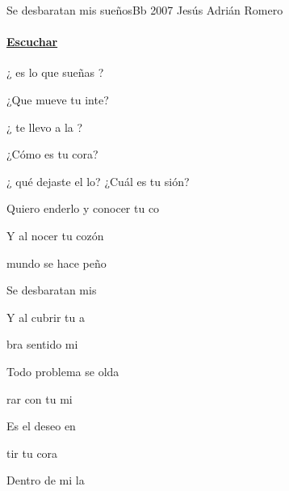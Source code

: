 \documentclass[12pt, spanish]{book}
\begin{document}
    \begin{song}{Se desbaratan mis sueños}{Bb}
    {2007} %
    {Jesús Adrián Romero}
    {} %
    {}
        \ifChordBk
            \paragraph{\mbox{}\hfill\protect\href{https://open.spotify.com/intl-es/track/2gJawrNKr8ZOANF4e4nwE3}{Escuchar}\mbox{}\hfill}
        \fi


        \begin{SBOpGroup}
            ¿ es lo que sueñas ?

            ¿Que mueve tu inte?

            ¿ te llevo a la ?

            ¿Cómo es tu cora?
        \end{SBOpGroup}
        \vskip 20pt
        \begin{SBOpGroup}
            ¿ qué dejaste el lo? ¿Cuál es tu sión?

            Quiero enderlo y conocer tu co
        \end{SBOpGroup}

        \begin{SBChorus}
            Y al nocer tu cozón

             mundo se hace peño

            Se desbaratan mis 

            Y al cubrir tu  a

            bra sentido mi 

            Todo problema se olda
        \end{SBChorus}

        \begin{SBOpGroup}
            rar con tu mi

            Es el deseo en 

            tir tu cora

            Dentro de mi la


\end{SBOpGroup}
\end{song}
\end{document}
